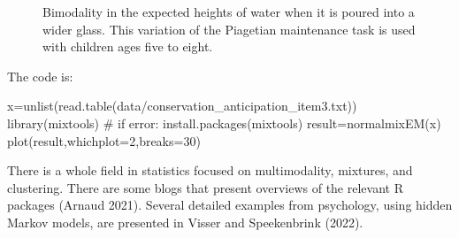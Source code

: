 \documentclass[
  a4paper,
  DIV=11,
  numbers=noendperiod,
  oneside]{scrreprt}
\newenvironment{Shaded}{}{}
\newcommand{\AttributeTok}[1]{\textcolor[rgb]{0.84,0.23,0.29}{#1}}
\newcommand{\CommentTok}[1]{\textcolor[rgb]{0.42,0.45,0.49}{#1}}
\newcommand{\DecValTok}[1]{\textcolor[rgb]{0.00,0.36,0.77}{#1}}
\newcommand{\FunctionTok}[1]{\textcolor[rgb]{0.44,0.26,0.76}{#1}}
\newcommand{\NormalTok}[1]{\textcolor[rgb]{0.14,0.16,0.18}{#1}}
\newcommand{\OtherTok}[1]{\textcolor[rgb]{0.44,0.26,0.76}{#1}}
\newcommand{\StringTok}[1]{\textcolor[rgb]{0.01,0.18,0.38}{#1}}
\begin{document}
\begin{figure}


\caption{\label{fig-ch3-img20-old-32}Bimodality in the expected heights
of water when it is poured into a wider glass. This variation of the
Piagetian maintenance task is used with children ages five to eight.}

\end{figure}%

The code is:

\begin{Shaded}
\begin{Highlighting}[]
\NormalTok{x}\OtherTok{=}\FunctionTok{unlist}\NormalTok{(}\FunctionTok{read.table}\NormalTok{(}\StringTok{\textquotesingle{}data/conservation\_anticipation\_item3.txt\textquotesingle{}}\NormalTok{))}
\FunctionTok{library}\NormalTok{(mixtools) }\CommentTok{\# if error: install.packages(\textquotesingle{}mixtools\textquotesingle{})}
\NormalTok{result}\OtherTok{=}\FunctionTok{normalmixEM}\NormalTok{(x)}
\FunctionTok{plot}\NormalTok{(result,}\AttributeTok{whichplot=}\DecValTok{2}\NormalTok{,}\AttributeTok{breaks=}\DecValTok{30}\NormalTok{)}
\end{Highlighting}
\end{Shaded}

There is a whole field in statistics focused on multimodality, mixtures,
and clustering. There are some blogs that present overviews of the
relevant R packages (Arnaud 2021). Several detailed examples from
psychology, using hidden Markov models, are presented in Visser and
Speekenbrink (2022).
\end{document}
